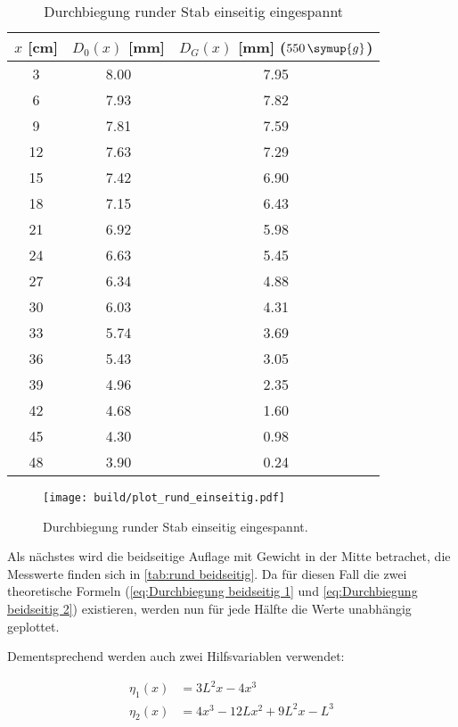 \begin{table} [H]
  \centering
  \caption{Durchbiegung runder Stab einseitig eingespannt}
  \label{tab:rund einseitig}
  \begin{tabular}{S[table-format=2.0] S[table-format=2.0] S[table-format=2.0]}
    \toprule
    {$x$ [cm]} & {$D_{0}(x)$ [mm]} & {$D_{G}(x)$ [mm] ($550\,\symup{g}$)} \\
     & 8.00 & 7.95 \\
     6 & 7.93 & 7.82 \\
     9 & 7.81 & 7.59 \\
    12 & 7.63 & 7.29 \\
    15 & 7.42 & 6.90 \\ 
    18 & 7.15 & 6.43 \\
    21 & 6.92 & 5.98 \\
    24 & 6.63 & 5.45 \\
    27 & 6.34 & 4.88 \\
    30 & 6.03 & 4.31 \\
    33 & 5.74 & 3.69 \\
    36 & 5.43 & 3.05 \\
    39 & 4.96 & 2.35 \\
    42 & 4.68 & 1.60 \\
    45 & 4.30 & 0.98 \\
    48 & 3.90 & 0.24 \\ 
    \bottomrule
  \end{tabular}
\end{table}

\begin{figure} [H]
  \centering
  \texttt{[image: build/plot\_rund\_einseitig.pdf]}
  \caption{Durchbiegung runder Stab einseitig eingespannt.}
  \label{fig:rund_einseitig}
\end{figure}

Als nächstes wird die beidseitige Auflage mit Gewicht in der Mitte betrachet,
die Messwerte finden sich in \autoref{tab:rund beidseitig}.
Da für diesen Fall die zwei theoretische Formeln (\autoref{eq:Durchbiegung beidseitig 1} und \autoref{eq:Durchbiegung beidseitig 2}) existieren,
werden nun für jede Hälfte die Werte unabhängig geplottet.

Dementsprechend werden auch zwei Hilfsvariablen verwendet:

\begin{align}
  \eta_{1}(x)&=3L^{2}x-4x^{3}  \\
  \eta_{2}(x)&=4x^{3}-12Lx^{2}+9L^{2}x-L^{3}
\end{align}

